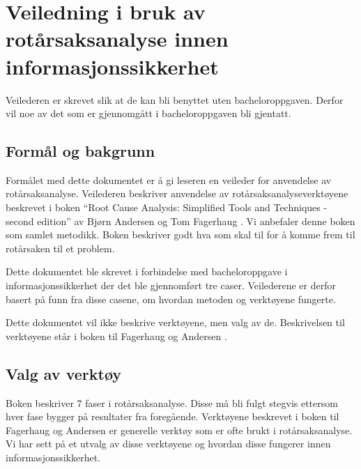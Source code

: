 \chapter{Veiledning i bruk av rotårsaksanalyse innen informasjonssikkerhet}
\label{kap:veiledning-RCA}
Veilederen er skrevet slik at de kan bli benyttet uten bacheloroppgaven. Derfor vil noe av det som er gjennomgått i bacheloroppgaven bli gjentatt.

\section{Formål og bakgrunn}
Formålet med dette dokumentet er å gi leseren en veileder for anvendelse av rotårsaksanalyse. Veilederen beskriver anvendelse av rotårsaksanalyseverktøyene beskrevet i boken ``Root Cause Analysis: Simplified Tools and Techniques - second edition'' av Bjørn Andersen og Tom Fagerhaug \cite{RCA}. Vi anbefaler denne boken som samlet metodikk. Boken beskriver godt hva som skal til for å komme frem til rotårsaken til et problem. 

Dette dokumentet ble skrevet i forbindelse med bacheloroppgave i informasjonssikkerhet der det ble gjennomført tre caser. Veilederene er derfor basert på funn fra disse casene, om hvordan metoden og verktøyene fungerte.

Dette dokumentet vil ikke beskrive verktøyene, men valg av de. Beskrivelsen til verktøyene står i boken til Fagerhaug og Andersen \cite{RCA}.

\section{Valg av verktøy}
Boken beskriver 7 faser i rotårsaksanalyse. Disse må bli fulgt stegvis ettersom hver fase bygger på resultater fra foregående. Verktøyene beskrevet i boken til Fagerhaug og Andersen \cite{RCA} er generelle verktøy som er ofte brukt i rotårsaksanalyse. Vi har sett på et utvalg av disse verktøyene og hvordan disse fungerer innen informasjonssikkerhet. 


